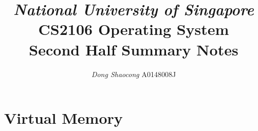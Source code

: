 \documentclass[11pt,a4paper]{article}
\title{\textsl{National University of Singapore} \\ \textbf{CS2106 Operating System}\\ Second Half Summary Notes}
\author{\textit{Dong Shaocong} A0148008J}
\theoremstyle{definition}
\begin{document}
\maketitle
\section{Virtual Memory}















\end{document}
